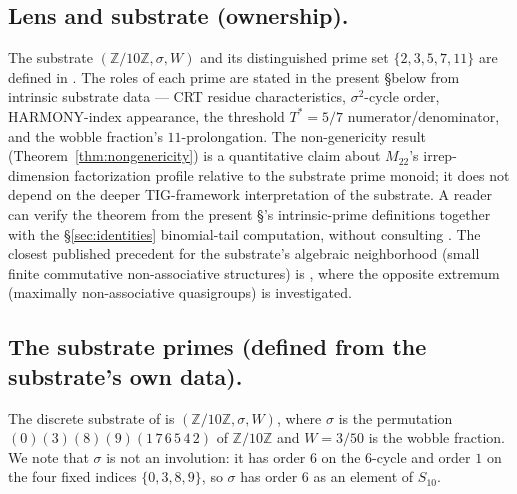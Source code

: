 \documentclass[11pt,reqno]{amsart}
\theoremstyle{plain}
\theoremstyle{definition}
\theoremstyle{remark}
\newcommand{\Z}{\mathbb{Z}}
\newcommand{\Mtwentytwo}{M_{22}}
\newcommand{\sig}{\sigma}
\begin{document}
\subsection*{Lens and substrate (ownership).}
The substrate $(\Z/10\Z, \sig, W)$ and its distinguished prime set
$\{2, 3, 5, 7, 11\}$ are defined in \cite{SandersGishFourCore}. The
roles of each prime are stated in the present \S below from
intrinsic substrate data --- CRT residue characteristics, $\sig^{2}$-cycle
order, HARMONY-index appearance, the threshold $T^{*} = 5/7$
numerator/denominator, and the wobble fraction's $11$-prolongation.
The non-genericity result (Theorem~\ref{thm:nongenericity}) is a
quantitative claim about $\Mtwentytwo$'s irrep-dimension factorization
profile relative to the substrate prime monoid; it does not depend
on the deeper TIG-framework interpretation of the substrate. A
reader can verify the theorem from the present \S's
intrinsic-prime definitions together with the \S\ref{sec:identities}
binomial-tail computation, without consulting \cite{SandersGishFourCore}.
The closest published precedent for the substrate's algebraic
neighborhood (small finite commutative non-associative structures) is
\cite{DrapalWanless2021}, where the opposite extremum (maximally
non-associative quasigroups) is investigated.

\subsection{The substrate primes (defined from the substrate's own data).}
The discrete substrate of \cite{SandersGishFourCore} is
$(\Z/10\Z, \sig, W)$, where $\sig$ is the permutation
$(0)(3)(8)(9)(1\,7\,6\,5\,4\,2)$ of $\Z/10\Z$ and $W = 3/50$ is the
wobble fraction. We note that $\sig$ is not an involution: it has
order $6$ on the $6$-cycle and order $1$ on the four fixed indices
$\{0, 3, 8, 9\}$, so $\sig$ has order $6$ as an element of $S_{10}$.
\end{document}
